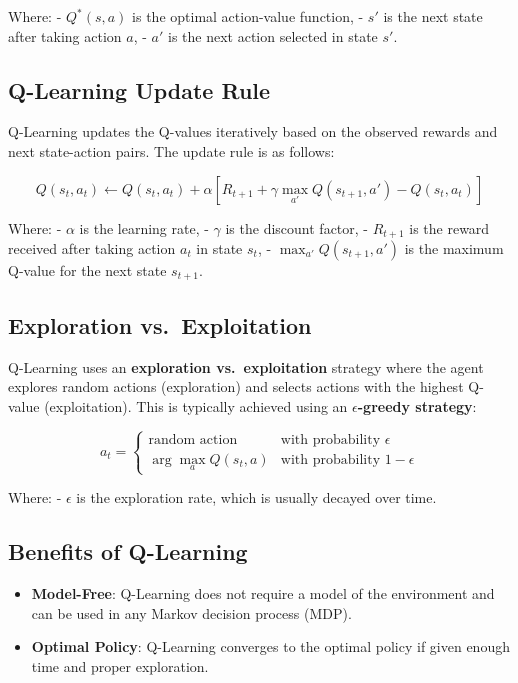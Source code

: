 \documentclass[
]{book}
\providecommand{\tightlist}{%
  \setlength{\itemsep}{0pt}\setlength{\parskip}{0pt}}
\begin{document}
Where:
- \(Q^*(s, a)\) is the optimal action-value function,
- \(s'\) is the next state after taking action \(a\),
- \(a'\) is the next action selected in state \(s'\).

\subsection{Q-Learning Update Rule}\label{q-learning-update-rule}

Q-Learning updates the Q-values iteratively based on the observed rewards and next state-action pairs. The update rule is as follows:

\[
Q(s_t, a_t) \leftarrow Q(s_t, a_t) + \alpha \left[ R_{t+1} + \gamma \max_{a'} Q(s_{t+1}, a') - Q(s_t, a_t) \right]
\]

Where:
- \(\alpha\) is the learning rate,
- \(\gamma\) is the discount factor,
- \(R_{t+1}\) is the reward received after taking action \(a_t\) in state \(s_t\),
- \(\max_{a'} Q(s_{t+1}, a')\) is the maximum Q-value for the next state \(s_{t+1}\).

\subsection{Exploration vs.~Exploitation}\label{exploration-vs.-exploitation-1}

Q-Learning uses an \textbf{exploration vs.~exploitation} strategy where the agent explores random actions (exploration) and selects actions with the highest Q-value (exploitation). This is typically achieved using an \textbf{\(\epsilon\)-greedy strategy}:

\[
a_t = \begin{cases} 
\text{random action} & \text{with probability } \epsilon \\
\arg \max_a Q(s_t, a) & \text{with probability } 1 - \epsilon
\end{cases}
\]

Where:
- \(\epsilon\) is the exploration rate, which is usually decayed over time.

\subsection{Benefits of Q-Learning}\label{benefits-of-q-learning}

\begin{itemize}
\tightlist
\item
  \textbf{Model-Free}: Q-Learning does not require a model of the environment and can be used in any Markov decision process (MDP).
\item
  \textbf{Optimal Policy}: Q-Learning converges to the optimal policy if given enough time and proper exploration.
\end{itemize}
\end{document}
